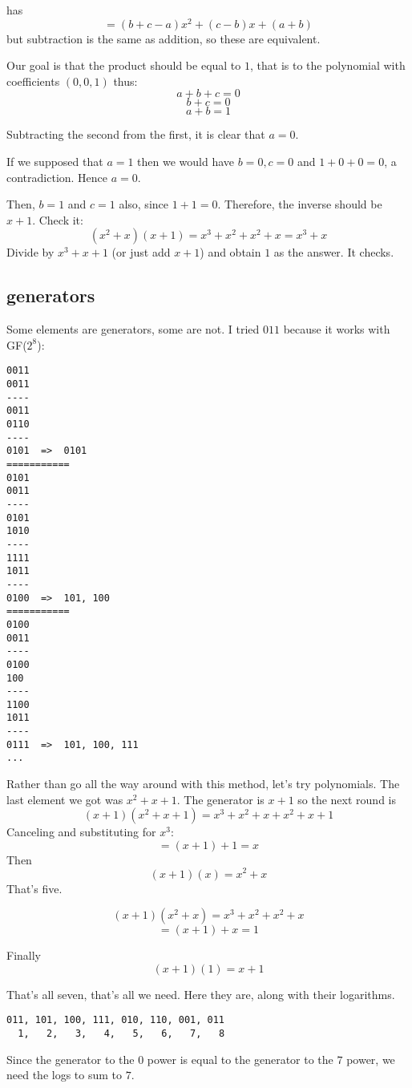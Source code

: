 \documentclass[11pt, oneside]{article}
\begin{document}
has
\[ = (b + c - a)x^2 + (c - b)x + (a + b) \]
but subtraction is the same as addition, so these are equivalent.

Our goal is that the product should be equal to $1$, that is to the polynomial with coefficients $(0,0,1)$ thus:
\[ a + b + c = 0 \]
\[ b + c = 0 \]
\[ a + b = 1 \]

Subtracting the second from the first, it is clear that $a = 0$.  

If we supposed that $a = 1$ then we would have $b = 0, c = 0$ and $1 + 0 + 0 = 0$, a contradiction.  Hence $a = 0$.

Then, $b = 1$ and $c = 1$ also, since $1 + 1 = 0$.  Therefore, the inverse should be $x + 1$.  Check it:
\[ (x^2 + x)(x + 1) = x^3 + x^2 + x^2 + x = x^3 + x \]
Divide by $x^3 + x + 1$ (or just add $x + 1$) and obtain $1$ as the answer.  It checks.

\subsection*{generators}

Some elements are generators, some are not.  I tried $011$ because it works with GF($2^8$):

\begin{verbatim}
0011
0011
----
0011
0110
----
0101  =>  0101
===========
0101
0011
----
0101
1010
----
1111
1011
----
0100  =>  101, 100
===========
0100
0011
----
0100
100
----
1100
1011
----
0111  =>  101, 100, 111
...
\end{verbatim}
Rather than go all the way around with this method, let's try polynomials.  The last element we got was $x^2 + x + 1$.  The generator is $x + 1$ so the next round is
\[ (x + 1)(x^2 + x + 1) = x^3 + x^2 + x + x^2 + x + 1 \]
Canceling and substituting for $x^3$:
\[ = (x + 1) + 1 = x \]
Then
\[ (x + 1)(x) = x^2 + x \]
That's five.

\[ (x + 1)(x^2 + x) = x^3 + x^2 + x^2 + x \]
\[ = (x + 1) + x = 1\]

Finally
\[ (x + 1)(1) = x + 1 \]

That's all seven, that's all we need.  Here they are, along with their logarithms.

\begin{verbatim}
011, 101, 100, 111, 010, 110, 001, 011
  1,   2,   3,   4,   5,   6,   7,   8
\end{verbatim}
Since the generator to the $0$ power is equal to the generator to the $7$ power, we need the logs to sum to $7$.  
\end{document}
